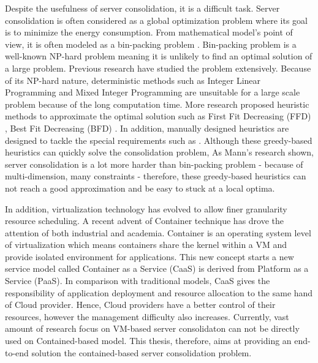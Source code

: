 Despite the usefulness of server consolidation, it is a difficult task. 
Server consolidation is often considered as a global optimization problem 
where its goal is to minimize the energy consumption. 
From mathematical model's point of view, it is often modeled as a bin-packing problem \cite{Mann:2015ua}.
Bin-packing problem is a well-known NP-hard problem meaning it is unlikely to find an optimal solution 
of a large problem. Previous research have studied the problem extensively. 
Because of its NP-hard nature, deterministic methods such as  
Integer Linear Programming \cite{Speitkamp:2010ck} and Mixed
Integer Programming \cite{Wang:2016eh} are unsuitable for a large scale problem 
because of the long computation time.  More research proposed heuristic methods
 to approximate the optimal solution such as 
First Fit Decreasing (FFD) \cite{Panigrahy:2011wk}, Best Fit Decreasing (BFD) \cite{Xu:2010vh}.
In addition, manually designed heuristics are designed to tackle the special requirements such 
as \cite{Li:2009wf, Gupta:2008ul, Jung:2008vb}. Although these greedy-based heuristics can quickly solve the consolidation problem,  As Mann's research \cite{Mann:2015ua} shown, 
server consolidation is a lot more harder than bin-packing problem - because of multi-dimension, many constraints - 
therefore, these greedy-based heuristics can not reach a good approximation and be easy to 
stuck at a local optima.

In addition, virtualization technology has evolved to allow finer granularity resource scheduling.
A recent advent of Container technique \cite{Soltesz:2007cu} has drove the attention of both industrial and academia.
Container is an operating system level of virtualization which means containers share the kernel within a VM and provide isolated environment for applications.
This new concept starts a new service model called Container as a Service (CaaS) \cite{Piraghaj:2015uf} is derived from Platform as a Service (PaaS). 
In comparison with traditional models, CaaS gives the responsibility of application 
deployment and resource allocation to the same hand of Cloud provider.
Hence, Cloud providers have a better control of their resources, however the management difficulty also increases. 
Currently, vast amount of research focus on VM-based server consolidaton can not be directly used on Contained-based model.
This thesis, therefore, aims at providing an end-to-end solution the contained-based server consolidation problem.




